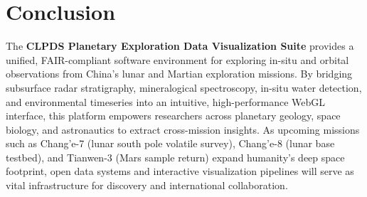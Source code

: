 \section{Conclusion}

The \textbf{CLPDS Planetary Exploration Data Visualization Suite} provides a unified, FAIR-compliant software environment for exploring in-situ and orbital observations from China's lunar and Martian exploration missions. By bridging subsurface radar stratigraphy, mineralogical spectroscopy, in-situ water detection, and environmental timeseries into an intuitive, high-performance WebGL interface, this platform empowers researchers across planetary geology, space biology, and astronautics to extract cross-mission insights. As upcoming missions such as Chang'e-7 (lunar south pole volatile survey), Chang'e-8 (lunar base testbed), and Tianwen-3 (Mars sample return) expand humanity's deep space footprint, open data systems and interactive visualization pipelines will serve as vital infrastructure for discovery and international collaboration.
